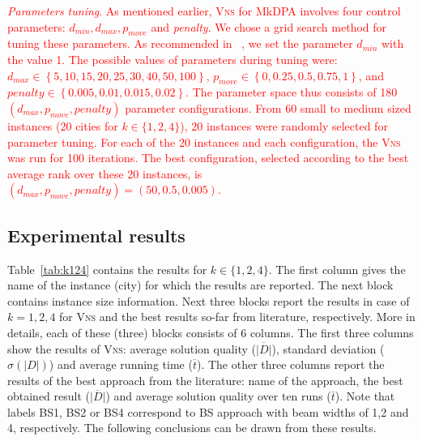 \documentclass[dvipsnames,format=sigconf]{acmart} %
\begin{document}
   \textcolor{red}{\emph{Parameters tuning}. As mentioned earlier, \textsc{Vns} for MkDPA involves four control parameters: $d_{min}, d_{max}, p_{move}$ and \emph{penalty}. We chose a grid search method for tuning these parameters. As recommended in  ~\cite{mladenovic1997variable}, we set the parameter $d_{min}$ with the value 1. The possible values of parameters during tuning were:
  $d_{max}\in{\left\lbrace 5, 10, 15, 20, 25, 30, 40, 50, 100\right\rbrace }$,  $p_{move}\in{\left\lbrace 0, 0.25, 0.5, 0.75, 1\right\rbrace }$, and $penalty\in{\left\lbrace 0.005, 0.01, 0.015, 0.02\right\rbrace }$. The parameter space thus consists of 180 $(d_{max}, p_{move}, penalty)$ parameter configurations. From 60 small to medium sized instances (20 cities for $k \in \{1, 2, 4\}$), 20 instances were randomly selected for parameter tuning. For each of the 20 instances and each configuration, the \textsc{Vns} was run for 100 iterations. The best configuration, selected according to the best average rank over these 20 instances, is $(d_{max}, p_{move}, penalty )=(50,0.5, 0.005)$.}

\subsection{Experimental results }
{ \color{red} Table~\ref{tab:k124} contains the results for $k \in \{1, 2,4\}$.  The first column gives the name of the instance (city) for which the results are reported. The next block contains   instance size information. Next three blocks report the results in case of $k=1,2,4$ for \textsc{Vns} and the best results so-far from literature, respectively.  More in details, each of these (three) blocks consists of 6 columns. The first three columns show the results of \textsc{Vns}: average solution quality ($\overline{|D|}$), standard deviation ($\sigma(|D|)$) and average running time ($\overline{t}$).  The other three columns report  the results of the best approach from the literature:   name of the approach,  the best obtained  result ($\overline{|D|}$) and average solution quality over ten runs ($\overline{t}$).  Note that   labels BS1, BS2 or BS4 correspond to BS approach with beam widths of 1,2 and 4, respectively. } The following conclusions can be drawn from these results. 
\end{document}
